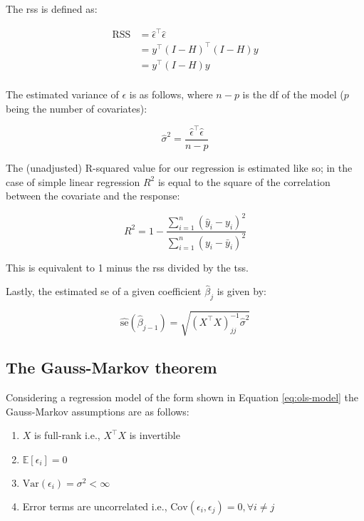 \documentclass{report}
\begin{document}
The \gls{rss} is defined as:

\begin{equation}\label{eq:ols-rss}
    \begin{aligned}
        \text{RSS}
          &= \hat{\epsilon}^\intercal\hat{\epsilon} \\
          &= y^\intercal (I - H)^\intercal (I - H) y \\
          &= y^\intercal (I - H) y \\
    \end{aligned}
\end{equation}

The estimated variance of $\epsilon$ is as follows, where $n - p$ is the \gls{df} of the model ($p$ being the number of covariates):

\begin{equation}\label{eq:ols-sigma-squared}
    \hat{\sigma}^2 = \frac{\hat{\epsilon}^\intercal\hat{\epsilon}}{n - p}
\end{equation}

The (unadjusted) R-squared value for our regression is estimated like so; in the case of simple linear regression $R^2$ is equal to the square of the correlation between the covariate and the response:

\begin{equation}\label{ols-r-squared}
    R^2 = 1 - \frac{\sum_{i=1}^n (\hat{y}_i - y_i)^2}{\sum_{i=1}^n (y_i - \bar{y}_i)^2}
\end{equation}

This is equivalent to 1 minus the \gls{rss} divided by the \gls{tss}. 

Lastly, the estimated \gls{se} of a given coefficient $\hat{\beta}_j$ is given by:

\begin{equation}\label{ols-beta-se}
    \widehat{\text{se}}\left(\hat{\beta}_{j-1}\right) = \sqrt{(X^\intercal X)^{-1}_{jj}\hat{\sigma}^2}
\end{equation}

\subsection{The Gauss-Markov theorem}

Considering a regression model of the form shown in Equation \ref{eq:ols-model} the Gauss-Markov assumptions are as follows:

\begin{enumerate}
    \item $X$ is full-rank i.e., $X^\intercal X$ is invertible
    \item $\mathbb{E}[\epsilon_i] = 0$
    \item $\text{Var}(\epsilon_i) = \sigma^2 < \infty$
    \item Error terms are uncorrelated i.e., $\text{Cov}(\epsilon_i, \epsilon_j) = 0, \forall i \neq j$
\end{enumerate}
\end{document}
